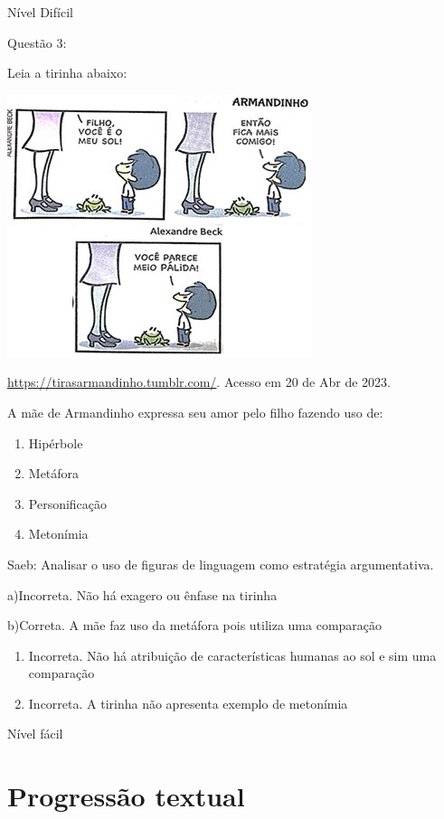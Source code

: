 {Nível Difícil

Questão 3:

Leia a tirinha abaixo:

\includegraphics[width=3.51042in,height=3.02083in]{./imgSAEB_7_POR/media/image14.png}

\href{https://tirasarmandinho.tumblr.com/}{\uline{https://tirasarmandinho.tumblr.com/}}.
Acesso em 20 de Abr de 2023.

A mãe de Armandinho expressa seu amor pelo filho fazendo uso de:

\begin{enumerate}
\def\labelenumi{\alph{enumi})}
\item
  Hipérbole
\item
  Metáfora
\item
  Personificação
\item
  Metonímia
\end{enumerate}

Saeb: Analisar o uso de figuras de linguagem como estratégia
argumentativa.

a)Incorreta. Não há exagero ou ênfase na tirinha

b)Correta. A mãe faz uso da metáfora pois utiliza uma comparação

\begin{enumerate}
\def\labelenumi{\arabic{enumi}.}
\item
  Incorreta. Não há atribuição de características humanas ao sol e sim
  uma comparação
\item
  Incorreta. A tirinha não apresenta exemplo de metonímia
\end{enumerate}

Nível fácil


\chapter{Progressão textual}

}
